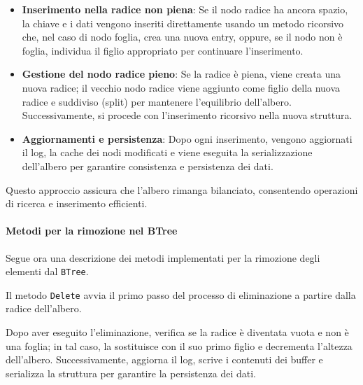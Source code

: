 \documentclass[12pt,a4paper,openright,twoside]{book}
\begin{document}
                    \begin{itemize}
                        \item \textbf{Inserimento nella radice non piena}: Se il nodo radice ha ancora spazio, la chiave e i dati vengono inseriti direttamente usando un metodo ricorsivo che, nel caso di nodo foglia, crea una nuova entry, oppure, se il nodo non è foglia, individua il figlio appropriato per continuare l'inserimento.
                        \item \textbf{Gestione del nodo radice pieno}: Se la radice è piena, viene creata una nuova radice; il vecchio nodo radice viene aggiunto come figlio della nuova radice e suddiviso (split) per mantenere l'equilibrio dell'albero. Successivamente, si procede con l'inserimento ricorsivo nella nuova struttura.
                        \item \textbf{Aggiornamenti e persistenza}: Dopo ogni inserimento, vengono aggiornati il log, la cache dei nodi modificati e viene eseguita la serializzazione dell'albero per garantire consistenza e persistenza dei dati.
                    \end{itemize}

                    Questo approccio assicura che l'albero rimanga bilanciato, consentendo operazioni di ricerca e inserimento efficienti.

                    

                    \clearpage

                \paragraph{Metodi per la rimozione nel BTree}

                    Segue ora una descrizione dei metodi implementati per la rimozione degli elementi dal \texttt{BTree}.

                    Il metodo \texttt{Delete} avvia il primo passo del processo di eliminazione a partire dalla radice dell'albero.

                    Dopo aver eseguito l'eliminazione, verifica se la radice è diventata vuota e non è una foglia; in tal caso, la sostituisce con il suo primo figlio e decrementa l'altezza dell'albero. Successivamente, aggiorna il log, scrive i contenuti dei buffer e serializza la struttura per garantire la persistenza dei dati.

                    
\end{document}
